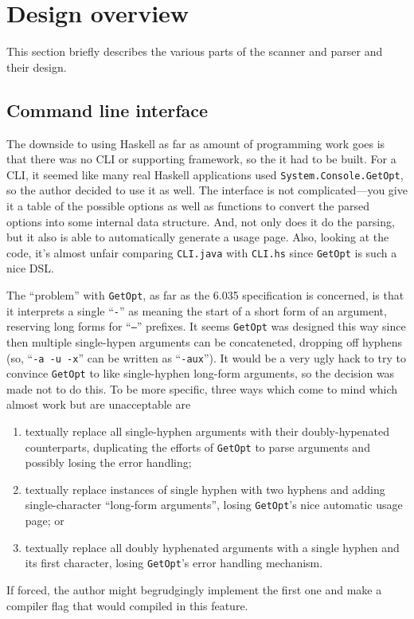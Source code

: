 \documentclass[11pt]{article}
\begin{document}
\section{Design overview}
\label{sec:design-overview}

This section briefly describes the various parts of the scanner and
parser and their design.

\subsection{Command line interface}
\label{sec:comm-line-interf}

The downside to using Haskell as far as amount of programming work
goes is that there was no CLI or supporting framework, so the it had
to be built.  For a CLI, it seemed like many real Haskell applications
used \texttt{System.Console.GetOpt}, so the author decided to use it
as well.  The interface is not complicated---you give it a table of
the possible options as well as functions to convert the parsed
options into some internal data structure.  And, not only does it do
the parsing, but it also is able to automatically generate a usage
page. Also, looking at the code, it's almost unfair comparing
\texttt{CLI.java} with \texttt{CLI.hs} since \texttt{GetOpt} is such a
nice DSL.

The ``problem'' with \texttt{GetOpt}, as far as the 6.035
specification is concerned, is that it interprets a single
``\texttt{-}'' as meaning the start of a short form of an argument,
reserving long forms for ``\texttt{--}'' prefixes.  It seems
\texttt{GetOpt} was designed this way since then multiple single-hypen
arguments can be concateneted, dropping off hyphens (so, ``\texttt{-a
  -u -x}'' can be written as ``\texttt{-aux}''). It would be a very
ugly hack to try to convince \texttt{GetOpt} to like single-hyphen
long-form arguments, so the decision was made not to do this.  To be
more specific, three ways which come to mind which almost work but are
unacceptable are
\begin{enumerate}
\item textually replace all single-hyphen arguments with their
  doubly-hypenated counterparts, duplicating the efforts of
  \texttt{GetOpt} to parse arguments and possibly losing the error
  handling;
\item textually replace instances of single hyphen with two hyphens
  and adding single-character ``long-form arguments'', losing
  \texttt{GetOpt}'s nice automatic usage page; or
\item textually replace all doubly hyphenated arguments with a single
  hyphen and its first character, losing \texttt{GetOpt}'s error
  handling mechanism.
\end{enumerate}
If forced, the author might begrudgingly implement the first one and
make a compiler flag that would compiled in this feature.
\end{document}
